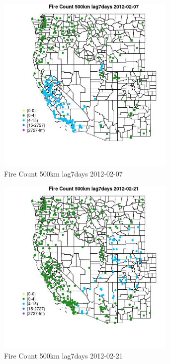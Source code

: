 \begin{figure} 
\centering  
\includegraphics[width=0.77\textwidth]{Code_Outputs/Report_ML_input_PM25_Step4_part_f_de_duplicated_aves_prioritize_24hr_obswNAs_MapObsFire_Count_500km_lag7days2012-02-07.jpg} 
\caption{\label{fig:Report_ML_input_PM25_Step4_part_f_de_duplicated_aves_prioritize_24hr_obswNAsMapObsFire_Count_500km_lag7days2012-02-07}Fire Count 500km lag7days 2012-02-07} 
\end{figure} 
 

\begin{figure} 
\centering  
\includegraphics[width=0.77\textwidth]{Code_Outputs/Report_ML_input_PM25_Step4_part_f_de_duplicated_aves_prioritize_24hr_obswNAs_MapObsFire_Count_500km_lag7days2012-02-21.jpg} 
\caption{\label{fig:Report_ML_input_PM25_Step4_part_f_de_duplicated_aves_prioritize_24hr_obswNAsMapObsFire_Count_500km_lag7days2012-02-21}Fire Count 500km lag7days 2012-02-21} 
\end{figure} 
 

